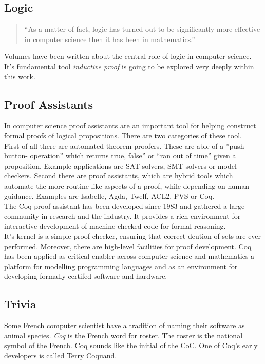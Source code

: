 \subsection{Logic}

\begin{quote}
``As a matter of fact, logic has turned out to be significantly more effective in computer science then it has been in mathematics.''
\end{quote}
Volumes have been written about the central role of logic in computer science. 
It's fundamental tool {\itshape inductive proof} is going to be explored very deeply within this work.

\subsection{Proof Assistants}
In computer science proof assistants are an important tool for helping construct formal proofs of logical propositions.
There are two categories of these tool.\\
First of all there are automated theorem proofers. 
These are able of a ''push-button- operation'' which returns true, false'' or ``ran out of time'' given a proposition.
Example applications are \gls{SAT-solvers}, \gls{SMT-solvers} or \glspl{model checker}. 
Second there are proof assistants, which are hybrid tools which automate the more routine-like aspects of a proof, while depending on human guidance. 
Examples are \gls{Isabelle}, Agda, Twelf, ACL2, PVS or Coq.\\
The Coq proof assistant has been developed since 1983 and gathered a large community in research and the industry.
It provides a rich environment for interactive development of machine-checked code for formal reasoning.\\
It's kernel is a simple proof checker, ensuring that correct deution of sets are ever performed. 
Moreover, there are high-level facilities for proof development.
Coq has been applied as critical enabler across computer science and mathematics a platform for modelling programming languages and as an environment for developing formally certifed software and hardware.
 

\subsection{Trivia}
Some French computer scientist have a tradition of naming their software as animal species.
{\itshape Coq} is the French word for roster.
The roster is the national symbol of the French.
Coq sounds like the initial of the \gls{CoC}.
One of Coq's early developers is called Terry Coquand.

